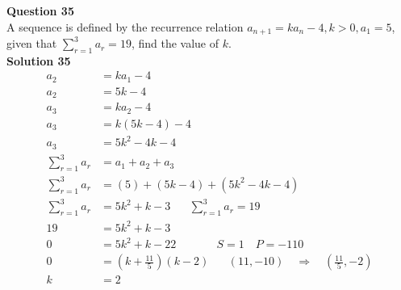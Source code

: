 \documentclass{article}
\begin{document}
\noindent\textbf{Question 35}\\[5pt]
A sequence is defined by the recurrence relation $a_{n+1}=ka_n-4,k>0, a_1=5$, given that $\displaystyle\sum_{r=1}^{3} a_r=19$, find the value of $k$.\\[5pt]
\noindent\textbf{Solution 35}\\[5pt]
\begin{align*}
a_2&=ka_1-4\\[2pt]
a_2&=5k-4\\[12pt]
a_3&=ka_2-4\\[2pt]
a_3&=k(5k-4)-4\\[2pt]
a_3&=5k^2-4k-4\\[12pt]
\displaystyle\sum_{r=1}^{3} a_r&=a_1+a_2+a_3\\[2pt]
\displaystyle\sum_{r=1}^{3} a_r&=(5)+(5k-4)+(5k^2-4k-4)\\[2pt]
\displaystyle\sum_{r=1}^{3} a_r&=5k^2+k-3\hspace{20pt}\displaystyle\sum_{r=1}^{3} a_r=19\\[2pt]
19&=5k^2+k-3\\[2pt]
0&=5k^2+k-22\hspace{43pt}S=1 \quad P=-110\\[2pt]
0&=\left(k+\displaystyle\frac{11}{5}\right)(k-2)\hspace{20pt}(11,-10)\quad \Rightarrow \quad \left(\displaystyle\frac{11}{5},-2\right)\\[2pt]
k&=2
\end{align*}\\[10pt]
\end{document}
